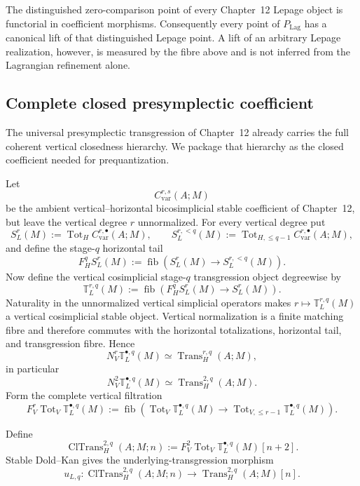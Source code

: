 The distinguished zero-comparison point of every Chapter~12 Lepage object is
functorial in coefficient morphisms.  Consequently every point of
$P_{\mathrm{Lag}}$ has a canonical lift of that distinguished Lepage point.  A
lift of an arbitrary Lepage realization, however, is measured by the fibre above
and is not inferred from the Lagrangian refinement alone.

\subsection{Complete closed presymplectic coefficient}
\label{subsec:prequantum-complete-closed-presymplectic-coefficient}

The universal presymplectic transgression of Chapter~12 already carries the full
coherent vertical closedness hierarchy.  We package that hierarchy as the closed
coefficient needed for prequantization.

Let
\[
C_{\mathrm{var}}^{r,s}(A;M)
\]
be the ambient vertical--horizontal bicosimplicial stable coefficient of
Chapter~12, but leave the vertical degree $r$ unnormalized.  For every vertical
degree put
\[
S_L^{r}(M)
:=
\operatorname{Tot}_H C_{\mathrm{var}}^{r,\bullet}(A;M),
\qquad
S_L^{r,<q}(M)
:=
\operatorname{Tot}_{H,\le q-1}
C_{\mathrm{var}}^{r,\bullet}(A;M),
\]
and define the stage-$q$ horizontal tail
\[
F_H^qS_L^{r}(M)
:=
\operatorname{fib}
\left(
S_L^{r}(M)
\longrightarrow
S_L^{r,<q}(M)
\right).
\]
Now define the vertical cosimplicial stage-$q$ transgression object degreewise by
\[
\boxed{
\mathbb T_L^{r,q}(M)
:=
\operatorname{fib}
\left(
F_H^qS_L^{r}(M)
\longrightarrow
S_L^{r}(M)
\right).
}
\]
Naturality in the unnormalized vertical simplicial operators makes
$r\mapsto\mathbb T_L^{r,q}(M)$ a vertical cosimplicial stable object.  Vertical
normalization is a finite matching fibre and therefore commutes with the
horizontal totalizations, horizontal tail, and transgression fibre.  Hence
\[
N_V^r\mathbb T_L^{\bullet,q}(M)
\simeq
\operatorname{Trans}^{r,q}_H(A;M),
\]
in particular
\[
N_V^2\mathbb T_L^{\bullet,q}(M)
\simeq
\operatorname{Trans}^{2,q}_H(A;M).
\]
Form the complete vertical filtration
\[
F_V^r\operatorname{Tot}_V\mathbb T_L^{\bullet,q}(M)
:=
\operatorname{fib}
\left(
\operatorname{Tot}_V\mathbb T_L^{\bullet,q}(M)
\longrightarrow
\operatorname{Tot}_{V,\le r-1}\mathbb T_L^{\bullet,q}(M)
\right).
\]

\begin{definition}
\label{def:prequantum-complete-closed-presymplectic-coefficient}
Define
\[
\boxed{
\operatorname{ClTrans}^{2,q}_H(A;M;n)
:=
F_V^2\operatorname{Tot}_V
\mathbb T_L^{\bullet,q}(M)[n+2].
}
\]
Stable Dold--Kan gives the underlying-transgression morphism
\[
\boxed{
u_{L,q}:
\operatorname{ClTrans}^{2,q}_H(A;M;n)
\longrightarrow
\operatorname{Trans}^{2,q}_H(A;M)[n].
}
\]
\end{definition}

